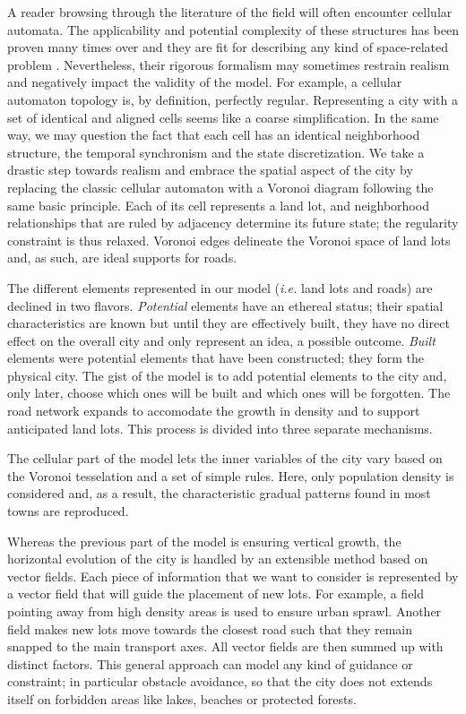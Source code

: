 \documentclass[10pt]{article}
\begin{document}
A reader browsing through the literature of the field will often
encounter cellular automata. The applicability and potential
complexity of these structures has been proven many times over and
they are fit for describing any kind of space-related problem
\cite{Edwards1993}. Nevertheless, their rigorous formalism may
sometimes restrain realism and negatively impact the validity of the
model. For example, a cellular automaton topology is, by definition,
perfectly regular. Representing a city with a set of identical and
aligned cells seems like a coarse simplification. In the same way, we
may question the fact that each cell has an identical neighborhood
structure, the temporal synchronism and the state discretization. We
take a drastic step towards realism and embrace the spatial aspect of
the city by replacing the classic cellular automaton with a Voronoi
diagram following the same basic principle. Each of its cell
represents a land lot, and neighborhood relationships that are ruled
by adjacency determine its future state; the regularity constraint is
thus relaxed. Voronoi edges delineate the Voronoi space of land lots
and, as such, are ideal supports for roads.

The different elements represented in our model (\textit{i.e.} land
lots and roads) are declined in two flavors. \textit{Potential}
elements have an ethereal status; their spatial characteristics are
known but until they are effectively built, they have no direct effect
on the overall city and only represent an idea, a possible
outcome. \textit{Built} elements were potential elements that have
been constructed; they form the physical city. The gist of the model
is to add potential elements to the city and, only later, choose which
ones will be built and which ones will be forgotten. The road network
expands to accomodate the growth in density and to support anticipated
land lots. This process is divided into three separate mechanisms.

The cellular part of the model lets the inner variables of the city
vary based on the Voronoi tesselation and a set of simple rules. Here,
only population density is considered and, as a result, the
characteristic gradual patterns found in most towns are reproduced.

Whereas the previous part of the model is ensuring vertical growth,
the horizontal evolution of the city is handled by an extensible
method based on vector fields. Each piece of information that we want
to consider is represented by a vector field that will guide the
placement of new lots. For example, a field pointing away from high
density areas is used to ensure urban sprawl. Another field makes new
lots move towards the closest road such that they remain snapped to
the main transport axes. All vector fields are then summed up with
distinct factors. This general approach can model any kind of guidance
or constraint; in particular obstacle avoidance, so that the city
does not extends itself on forbidden areas like lakes, beaches or
protected forests.
\end{document}
